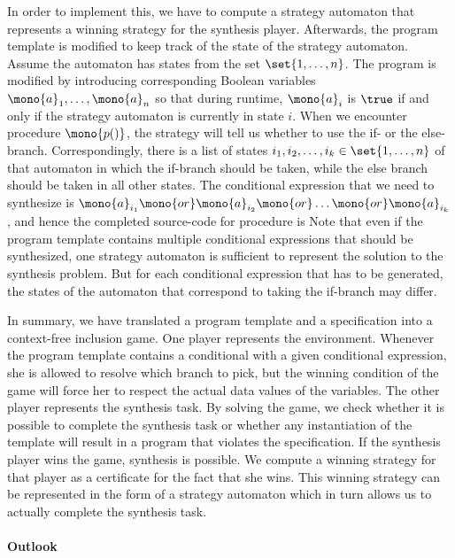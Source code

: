 \documentclass[../../diss.tex]{subfiles}
\begin{document}
In order to implement this, we have to compute a strategy automaton that represents a winning strategy for the synthesis player.
Afterwards, the program template is modified to keep track of the state of the strategy automaton.
Assume the automaton has states from the set $\set{1, \ldots, n}$.
The program is modified by introducing corresponding Boolean variables $\mono{a}_1, \ldots, \mono{a}_n$ so that during runtime, $\mono{a}_i$ is $\true$ if and only if the strategy automaton is currently in state $i$.
When we encounter procedure $\mono{p()}$, the strategy will tell us whether to use the if- or the else-branch.
Correspondingly, there is a list of states $i_1, i_2, \ldots, i_k \in \set{1, \ldots, n}$ of that automaton in which the if-branch should be taken, while the else branch should be taken in all other states.
The conditional expression that we need to synthesize is $\mono{a}_{i_1} \mono{ or } \mono{a}_{i_2} \mono{ or } \ldots \mono{ or } \mono{a}_{i_k}$, and hence the completed source-code for procedure  is 
Note that even if the program template contains multiple conditional expressions that should be synthesized, one strategy automaton is sufficient to represent the solution to the synthesis problem.
But for each conditional expression that has to be generated, the states of the automaton that correspond to taking the if-branch may differ.

In summary, we have translated a program template and a specification into a context-free inclusion game.
One player represents the environment.
Whenever the program template contains a conditional with a given conditional expression, she is allowed to resolve which branch to pick, but the winning condition of the game will force her to respect the actual data values of the variables.
The other player represents the synthesis task.
By solving the game, we check whether it is possible to complete the synthesis task or whether any instantiation of the template will result in a program that violates the specification.
If the synthesis player wins the game, synthesis is possible.
We compute a winning strategy for that player as a certificate for the fact that she wins.
This winning strategy can be represented in the form of a strategy automaton which in turn allows us to actually complete the synthesis task.

\paragraph{Outlook}
\end{document}
